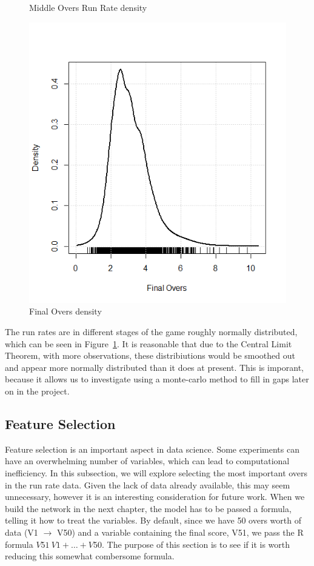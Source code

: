 \begin{figure}
      \caption{Middle Overs Run Rate density}
    \endminipage\hfill
      \includegraphics[width=\linewidth]{figures/finaloversdens.png}
      \caption{Final Overs density}
    \endminipage
    \label{rrDensities}
\end{figure}

The run rates are  in different stages of the game roughly normally distributed, which can be seen in Figure~\ref{rrDensities}. It is reasonable that due to the Central Limit Theorem, with more observations, these distribiutions would be smoothed out and 
appear more normally distributed than it does at present. This is imporant, because it allows us to investigate using a monte-carlo method to fill in gaps 
later on in the project.

\subsection{Feature Selection}
Feature selection is an important aspect in data science. Some experiments can have an overwhelming number of variables, which can lead to computational inefficiency. In this subsection, we will explore selecting the most important overs in the run rate data. Given the lack of data already available, this may seem unnecessary, however it is an interesting consideration for future work. When we build the network in the next chapter, the model has to be passed a formula, telling it how to treat the variables. By default, since we have 50 overs worth of data (V1 $\rightarrow$ V50) and a variable containing the final score, V51, we pass the R formula $V51 ~ V1 + \ldots + V50$. The purpose of this section is to see if it is worth reducing this somewhat combersome formula. \\

